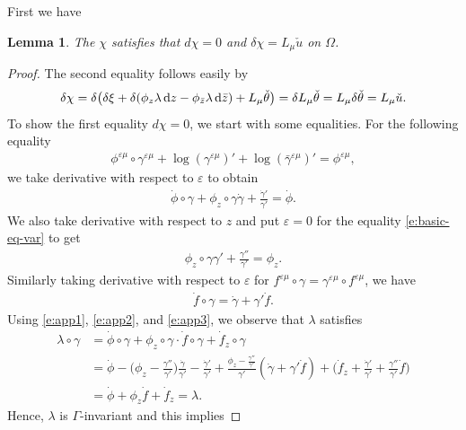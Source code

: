 \documentclass[10pt,a4paper]{amsart}
\numberwithin{equation}{section}
\newtheorem{Lemma}[Theorem]{Lemma}
\newcommand{\vep}{\varepsilon}
\begin{document}
First we have
\begin{Lemma}%
The ${\chi}$ satisfies that $d\chi=0$ and $\delta\chi=L_\mu\check{u}$ on $\Omega$.
\end{Lemma}
\begin{proof}
The second equality follows easily by
\begin{gather*}
\delta\chi=\delta\big(\delta\xi + \delta(\phi_z \lambda \,{\rm d}z - \phi_{\bar{z}} \lambda\, {\rm d}\bar{z}) + L_{\mu} \check{\theta}\big) = \delta L_\mu \check{\theta}= L_\mu\delta\check{\theta}=L_\mu\check{u}.
\end{gather*}
To show the first equality $d\chi=0$, we start with some equalities. For the following equality
\begin{gather}\label{e:basic-eq-var}
\phi^{\vep\mu}\circ \gamma^{\vep\mu} +\log (\gamma^{\vep\mu})' +\log (\bar{\gamma}^{\vep\mu})' = \phi^{\vep\mu},
\end{gather}
we take derivative with respect to $\vep$ to obtain
\begin{gather}\label{e:app1}
\dot{\phi}\circ\gamma +\phi_z\circ \gamma \dot{\gamma} +\frac{\dot{\gamma}'}{\gamma'} =\dot{\phi}.
\end{gather}
We also take derivative with respect to $z$ and put $\vep=0$ for the equality \eqref{e:basic-eq-var} to get
\begin{gather}\label{e:app2}
\phi_z\circ\gamma \gamma' +\frac{\gamma''}{\gamma'} =\phi_z.
\end{gather}
Similarly taking derivative with respect to $\vep$ for $f^{\vep\mu}\circ \gamma=\gamma^{\vep\mu}\circ f^{\vep\mu}$, we have
\begin{gather}\label{e:app3}
\dot{f}\circ\gamma=\dot{\gamma}+ \gamma'\dot{f}.
\end{gather}
Using \eqref{e:app1}, \eqref{e:app2}, and \eqref{e:app3}, we observe that $\lambda$ satisfies
\begin{align*}
\lambda \circ \gamma &= \dot{\phi}\circ \gamma +\phi_z\circ \gamma \cdot \dot{f}\circ\gamma +\dot{f}_z\circ \gamma
\\
 &= \dot{\phi} -\bigg(\phi_z -\frac{\gamma''}{\gamma'}\bigg)\frac{\dot{\gamma}}{\gamma'} -\frac{\dot{\gamma}'}{\gamma'}
 + \frac{\phi_z-\frac{\gamma''}{\gamma'}}{\gamma'} (\dot{\gamma}+\gamma' \dot{f})
 + \bigg(\dot{f}_z+\frac{\dot{\gamma}'}{\gamma'} +\frac{\gamma''}{\gamma'} \dot{f}\bigg)
 \\
& = \dot{\phi}+\phi_z\dot{f} +\dot{f}_z =\lambda.
\end{align*}
Hence, $\lambda$ is $\Gamma$-invariant and this implies

\end{proof}
\end{document}

